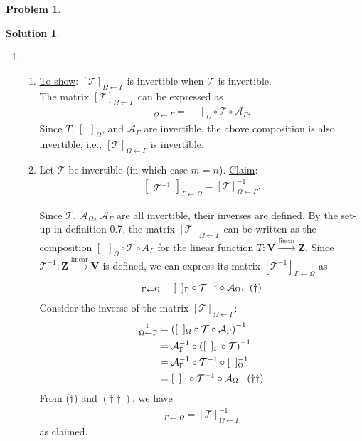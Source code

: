 \documentclass{book}
\theoremstyle{definition}
\newtheorem*{prob*}{Problem}
\newtheorem*{sln*}{Solution}
\newcommand{\V}{\mathbf{V}}
\newcommand{\Z}{\mathbf{Z}}
\newcommand{\lin}{\overset{\text{linear}}{\longrightarrow}}
\newcommand{\T}{\mathcal{T}}
\begin{document}
\begin{prob*}
\begin{sln*}
\begin{enumerate}
			
			
			
			
			\item 
			\begin{enumerate}
			\item \underline{To show}: $[\T]_{\Omega\leftarrow\Gamma}$ is invertible when $\T$ is invertible.\\
				
			The matrix $[\T]_{\Omega\leftarrow\Gamma}$ can be expressed as 
			\begin{align*}
			[\T]_{\Omega\leftarrow\Gamma} = [\,\,\,]_{\Omega}\circ \T \circ \mathcal{A}_{\Gamma}.
			\end{align*}
			Since $T$, $[\,\,\,]_\Omega$, and $\mathcal{A}_\Gamma$ are invertible, the above composition is also invertible, i.e., $[\T]_{\Omega\leftarrow\Gamma}$ is invertible. \\
			
			\item Let $\T$ be invertible (in which case $m=n$). \underline{Claim}:
			\begin{align*}
			\begin{bmatrix}
			\mathcal{T}^{-1}
			\end{bmatrix}_{\Gamma\leftarrow\Omega} = [\mathcal{T}]^{-1}_{\Omega\leftarrow \Gamma}.
			\end{align*}
			
			Since $\T$, $\mathcal{A}_{\Omega}$, $\mathcal{A}_\Gamma$ are all invertible, their inverses are defined. By the set-up in definition 0.7, the matrix $[\T]_{\Omega\leftarrow\Gamma}$ can be written as the composition $[\,\,\,]_\Omega \circ \T \circ A_{\Gamma}$ for the linear function $T : \V \lin \Z$. Since $\T^{-1} : \Z \lin \V$ is defined, we can express its matrix $[\T^{-1}]_{\Gamma\leftarrow\Omega}$ as
			\begin{align*}
			[\T^{-1}]_{\Gamma\leftarrow\Omega} = [\,\,\,]_\Gamma\circ \T^{-1} \circ \mathcal{A}_\Omega.\hspace{0.2cm}(\dagger)
			\end{align*}
			Consider the inverse of the matrix $[\T]_{\Omega\leftarrow\Gamma}$:
			\begin{align*}
			[\T]^{-1}_{\Omega\leftarrow\Gamma} &= \left([\,\,\,]_\Omega\circ \T \circ \mathcal{A}_\Gamma \right)^{-1}\\
			&= \mathcal{A}^{-1}_\Gamma \circ \left( [\,\,\,]_\Gamma \circ \T \right)^{-1}\\
			&= \mathcal{A}^{-1}_\Gamma \circ \T^{-1} \circ [\,\,\,]_\Omega^{-1}\\
			&= [\,\,\,]_\Gamma \circ \T^{-1} \circ \mathcal{A}_\Omega.\hspace{0.2cm}(\dagger\dagger)
			\end{align*}
			From ($\dagger$) and $(\dagger\dagger)$, we have
			\begin{align*}
				[\T^{-1}]_{\Gamma\leftarrow\Omega} = [\T]^{-1}_{\Omega\leftarrow\Gamma}
			\end{align*}
			as claimed.
			

\end{enumerate}
\end{enumerate}
\end{sln*}
\end{prob*}
\end{document}
